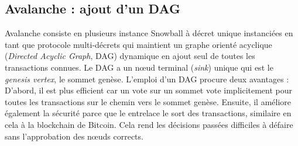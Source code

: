 \subsection{Avalanche : ajout d'un DAG}%

Avalanche consiste en plusieurs instance Snowball à décret unique instanciées en tant que protocole multi-décrets qui maintient un graphe orienté acyclique (\emph{Directed Acyclic Graph},  DAG) dynamique en ajout seul de toutes les transactions connues.
Le DAG a un nœud terminal (\emph{sink}) unique qui est le \emph{genesis vertex}, le sommet genèse. %
L'emploi d'un DAG procure deux avantages :
D'abord, il est plus efficient car un vote sur un sommet vote implicitement pour toutes les transactions sur le chemin vers le sommet genèse.
Ensuite, il améliore également la sécurité parce que le entrelace le sort des transactions, similaire en cela à la blockchain de Bitcoin.
Cela rend les décisions passées difficiles à défaire sans l'approbation des nœuds corrects.


